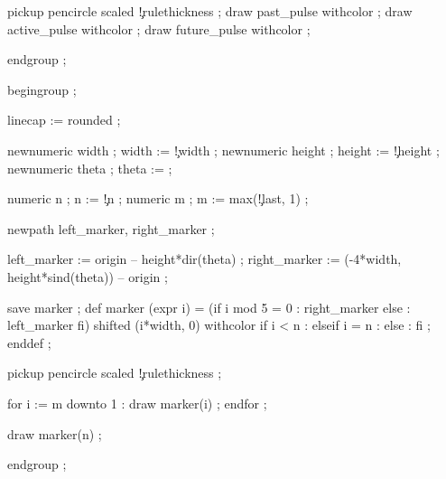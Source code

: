   pickup pencircle scaled \visualcounterparameter\c!rulethickness ;
  draw past_pulse   withcolor    ;
  draw active_pulse withcolor  ;
  draw future_pulse withcolor  ;

  endgroup ;
\stopuseMPgraphic




  begingroup ;

  linecap := rounded ;

  newnumeric width  ; width  := \visualcounterparameter\c!width ;
  newnumeric height ; height := \visualcounterparameter\c!height ;
  newnumeric theta  ; theta  :=  ;

  numeric n ; n := \visualcounterparameter\c!n ;
  numeric m ; m := max(\visualcounterparameter\c!last, 1) ;


  newpath left_marker, right_marker ;

  left_marker   := origin -- height*dir(theta) ;
  right_marker  := (-4*width, height*sind(theta)) -- origin ;

  save marker ;
  def marker (expr i) =
	(if i mod 5 = 0 : right_marker else : left_marker fi) 
		shifted (i*width, 0) 
		withcolor
			if i < n     :  
			elseif i = n : 
			else         : 
			fi ;
  enddef ;

  pickup pencircle scaled \visualcounterparameter\c!rulethickness ;

  for i := m downto 1 :
	  draw marker(i) ;
  endfor ;

  draw marker(n) ;

  endgroup ;
\stopuseMPgraphic

